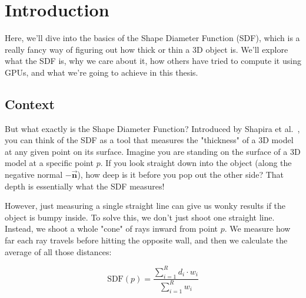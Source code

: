 \chapter{Introduction}

Here, we'll dive into the basics of the Shape Diameter Function (SDF), which is a really fancy way of figuring out how thick or thin a 3D object is. We'll explore what the SDF is, why we care about it, how others have tried to compute it using GPUs, and what we're going to achieve in this thesis.

\section{Context}

But what exactly is the Shape Diameter Function? Introduced by Shapira et al.\ \cite{shapira2008}, you can think of the SDF as a tool that measures the "thickness" of a 3D model at any given point on its surface. Imagine you are standing on the surface of a 3D model at a specific point $p$. If you look straight down into the object (along the negative normal $-\vec{\mathbf{n}}$), how deep is it before you pop out the other side? That depth is essentially what the SDF measures!

However, just measuring a single straight line can give us wonky results if the object is bumpy inside. To solve this, we don't just shoot one straight line. Instead, we shoot a whole "cone" of rays inward from point $p$. We measure how far each ray travels before hitting the opposite wall, and then we calculate the average of all those distances:

\begin{equation}
    \text{SDF}(p) = \frac{\sum_{i=1}^{R} d_i \cdot w_i}{\sum_{i=1}^{R} w_i}
\end{equation}

